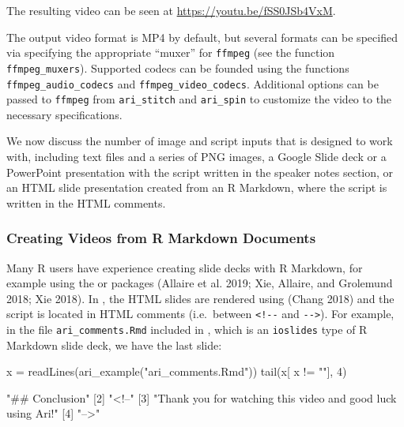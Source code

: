 The resulting video can be seen at \url{https://youtu.be/fSS0JSb4VxM}.

The output video format is MP4 by default, but several formats can be
specified via specifying the appropriate ``muxer'' for \texttt{ffmpeg}
(see the function \texttt{ffmpeg\_muxers}). Supported codecs can be
founded using the functions \texttt{ffmpeg\_audio\_codecs} and
\texttt{ffmpeg\_video\_codecs}. Additional options can be passed to
\texttt{ffmpeg} from \texttt{ari\_stitch} and \texttt{ari\_spin} to
customize the video to the necessary specifications.

We now discuss the number of image and script inputs that  is
designed to work with, including text files and a series of PNG images,
a Google Slide deck or a PowerPoint presentation with the script written
in the speaker notes section, or an HTML slide presentation created from
an R Markdown, where the script is written in the HTML comments.

\hypertarget{creating-videos-from-r-markdown-documents}{%
\subsubsection{Creating Videos from R Markdown
Documents}\label{creating-videos-from-r-markdown-documents}}

Many R users have experience creating slide decks with R Markdown, for
example using the  or  packages
(Allaire et al. 2019; Xie, Allaire, and Grolemund 2018; Xie 2018). In
, the HTML slides are rendered using  (Chang
2018) and the script is located in HTML comments (i.e.~between
\texttt{\textless{}!-\/-} and \texttt{-\/-\textgreater{}}). For example,
in the file \texttt{ari\_comments.Rmd} included in , which is
an \texttt{ioslides} type of R Markdown slide deck, we have the last
slide:

\begin{Schunk}
\begin{Sinput}
x = readLines(ari_example("ari_comments.Rmd"))
tail(x[ x != ""], 4)
\end{Sinput}
\begin{Soutput}
[1] "## Conclusion"                                             
[2] "<!--"                                                      
[3] "Thank you for watching this video and good luck using Ari!"
[4] "-->"                                                       
\end{Soutput}
\end{Schunk}

